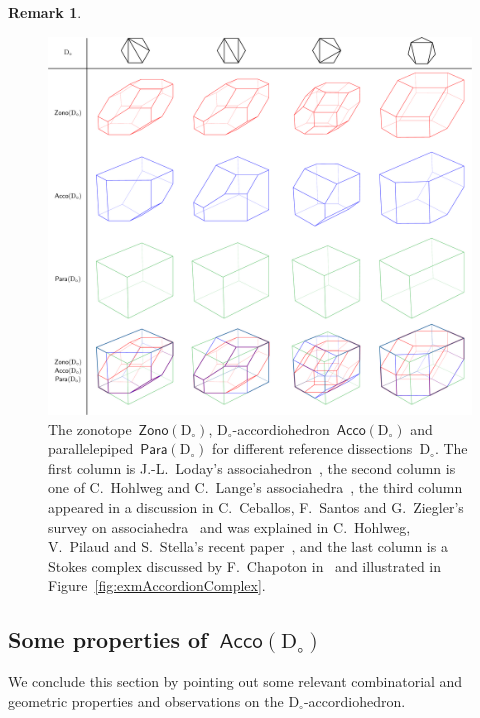 \documentclass{amsart}
\theoremstyle{definition}
\newtheorem{remark}[theorem]{Remark}
\newcommand{\Acco}{\mathsf{Acco}} %
\newcommand{\Para}{\mathsf{Para}} %
\newcommand{\Zono}{\mathsf{Zono}} %
\newcommand{\fref}[1]{Figure~\ref{#1}} %
\newcommand{\dissection}{\mathrm{D}} %
\begin{document}
\begin{remark}
\begin{figure}[t]
	\capstart
	\centerline{\includegraphics[width=\textwidth]{exmAccordiohedraDecomposed}}
	\caption{The zonotope~$\Zono(\dissection_\circ)$, $\dissection_\circ$-accordiohedron~$\Acco(\dissection_\circ)$ and parallelepiped~$\Para(\dissection_\circ)$ for different reference dissections~$\dissection_\circ$. The first column is J.-L.~Loday's associahedron~\cite{Loday}, the second column is one of C.~Hohlweg and C.~Lange's associahedra~\cite{HohlwegLange}, the third column appeared in a discussion in C.~Ceballos, F.~Santos and G.~Ziegler's survey on associahedra~\cite[Figure~3]{CeballosSantosZiegler} and was explained in C.~Hohlweg, V.~Pilaud and S.~Stella's recent paper~\cite{HohlwegPilaudStella}, and the last column is a Stokes complex discussed by F.~Chapoton in~\cite{Chapoton-quadrangulations} and illustrated in \fref{fig:exmAccordionComplex}.}
	\label{fig:exmAccordiohedra}
\end{figure}
\end{remark}


\subsection{Some properties of~$\Acco(\dissection_\circ)$}

We conclude this section by pointing out some relevant combinatorial and geometric properties and observations on the $\dissection_\circ$-accordiohedron.
\end{document}
